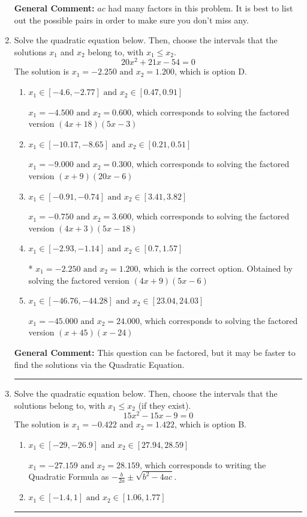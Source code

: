 \documentclass{extbook}[14pt]
\newcommand{\litem}[1]{\item #1

\rule{\textwidth}{0.4pt}}
\begin{document}
\begin{enumerate}
{\textbf{General Comment:} $ac$ had many factors in this problem. It is best to list out the possible pairs in order to make sure you don't miss any.
}
\litem{
Solve the quadratic equation below. Then, choose the intervals that the solutions $x_1$ and $x_2$ belong to, with $x_1 \leq x_2$.
\[ 20x^{2} +21 x -54 = 0 \]
The solution is \( x_1 = -2.250 \text{ and } x_2 = 1.200 \), which is option D.\begin{enumerate}[label=\Alph*.]
\item \( x_1 \in [-4.6, -2.77] \text{ and } x_2 \in [0.47, 0.91] \)

$x_1 = -4.500 \text{ and } x_2 = 0.600$, which corresponds to solving the factored version $(4x + 18)(5x -3)$
\item \( x_1 \in [-10.17, -8.65] \text{ and } x_2 \in [0.21, 0.51] \)

$x_1 = -9.000 \text{ and } x_2 = 0.300$, which corresponds to solving the factored version $(x + 9)(20x -6)$
\item \( x_1 \in [-0.91, -0.74] \text{ and } x_2 \in [3.41, 3.82] \)

$x_1 = -0.750 \text{ and } x_2 = 3.600$, which corresponds to solving the factored version $(4x + 3)(5x -18)$
\item \( x_1 \in [-2.93, -1.14] \text{ and } x_2 \in [0.7, 1.57] \)

* $x_1 = -2.250 \text{ and } x_2 = 1.200$, which is the correct option. Obtained by solving the factored version $(4x + 9)(5x -6)$
\item \( x_1 \in [-46.76, -44.28] \text{ and } x_2 \in [23.04, 24.03] \)

$x_1 = -45.000 \text{ and } x_2 = 24.000$, which corresponds to solving the factored version $(x + 45)(x -24)$
\end{enumerate}

\textbf{General Comment:} This question can be factored, but it may be faster to find the solutions via the Quadratic Equation.
}
\litem{
Solve the quadratic equation below. Then, choose the intervals that the solutions belong to, with $x_1 \leq x_2$ (if they exist).
\[ 15x^{2} -15 x -9 = 0 \]
The solution is \( x_1 = -0.422 \text{ and } x_2 = 1.422 \), which is option B.\begin{enumerate}[label=\Alph*.]
\item \( x_1 \in [-29, -26.9] \text{ and } x_2 \in [27.94, 28.59] \)

 $x_1 = -27.159 \text{ and } x_2 = 28.159$, which corresponds to writing the Quadratic Formula as $-\frac{b}{2a} \pm \sqrt{b^2 - 4ac}$.
\item \( x_1 \in [-1.4, 1] \text{ and } x_2 \in [1.06, 1.77] \)


\end{enumerate}}
\end{enumerate}
\end{document}
